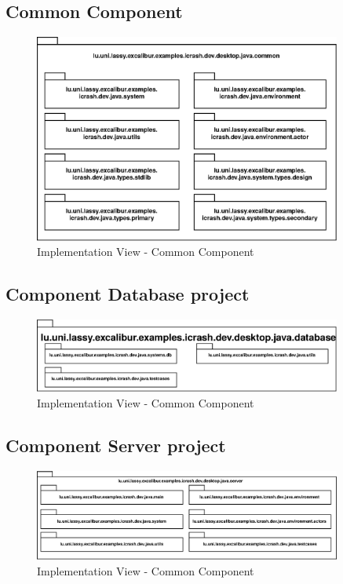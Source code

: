 \subsection{Common Component}
\begin{figure}[h!]
	\centering
	\includegraphics[width=0.9\textwidth]{./images/architecture/implementation_view/commons_project.eps}
	\caption{Implementation View - Common Component}
\end{figure}

\subsection{Component Database project}
\begin{figure}[h!]
	\centering
	\includegraphics[width=0.9\textwidth]{./images/architecture/implementation_view/database_project.eps}
	\caption{Implementation View - Common Component}
\end{figure}

\subsection{Component Server project}
\begin{figure}[h!]
	\centering
	\includegraphics[width=0.9\textwidth]{./images/architecture/implementation_view/server_project.eps}
	\caption{Implementation View - Common Component}
\end{figure}


